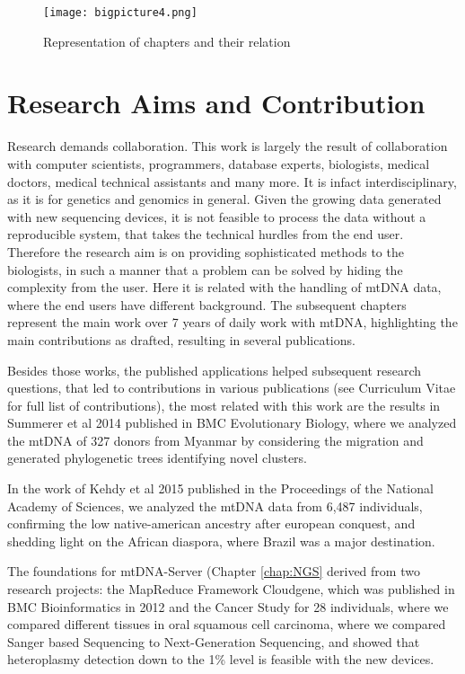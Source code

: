 \begin{figure}[ht]
\begin{center}
\texttt{[image: bigpicture4.png]}
\caption[Representation of chapters]{Representation of chapters and their relation}
\label{fig:figureBigPic}
\end{center}
\end{figure}

\section{Research Aims and Contribution}
Research demands collaboration. This work is largely the result of collaboration with computer scientists, programmers, database experts, biologists, medical doctors, medical technical assistants and many more. It is infact interdisciplinary, as it is for genetics and genomics in general. Given the growing data generated with new sequencing devices, it is not feasible to process the data without a reproducible system, that takes the technical hurdles from the end user. Therefore the research aim is on providing sophisticated methods to the biologists, in such a manner that a problem can be solved by hiding the complexity from the user. Here it is related with the handling of mtDNA data, where the end users have different background. The subsequent chapters represent the main work over 7 years of daily work with mtDNA, highlighting the main contributions as drafted, resulting in several publications. 

Besides those works, the published applications helped subsequent research questions, that led to contributions in various publications (see Curriculum Vitae for full list of contributions), the most related with this work are the results in Summerer et al 2014 published in BMC Evolutionary Biology, \cite{Summerer2014} where we analyzed the mtDNA of 327 donors from Myanmar by considering the migration and generated phylogenetic trees identifying novel clusters. 

In the work of Kehdy et al 2015 \cite{Kehdy2015} published in the Proceedings of the National Academy of Sciences, we analyzed the mtDNA data from 6,487 individuals, confirming the low native-american ancestry after european conquest, and shedding light on the African diaspora, where Brazil was a major destination.

The foundations for mtDNA-Server (Chapter \ref{chap:NGS} derived from two research projects: the MapReduce Framework Cloudgene\cite{Schonherr2012}, which was published in BMC Bioinformatics in 2012 and the Cancer Study for 28 individuals, where we compared different tissues in oral squamous cell carcinoma\cite{Kloss-Brandstatter2015}, where we compared Sanger based Sequencing to Next-Generation Sequencing, and showed that heteroplasmy detection down to the 1\% level is feasible with the new devices. 

